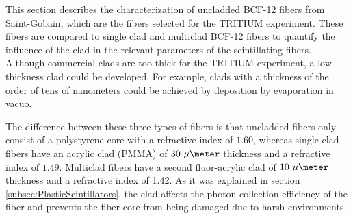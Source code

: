 This section describes the characterization of uncladded BCF-12 fibers from Saint-Gobain, which are the fibers selected for the TRITIUM experiment. These fibers are compared to single clad and multiclad BCF-12 fibers to quantify the influence of the clad in the relevant parameters of the scintillating fibers. Although commercial clads are too thick for the TRITIUM experiment, a low thickness clad could be developed. For example, clads with a thickness of the order of tens of nanometers could be achieved by deposition by evaporation in vacuo. 

The difference between these three types of fibers is that uncladded fibers only consist of a polystyrene core with a refractive index of $1.60$, whereas single clad fibers have an acrylic clad (PMMA) of $30~\mu\meter$ thickness and a refractive index of $1.49$. Multiclad fibers have a second fluor-acrylic clad of $10~\mu\meter$ thickness  and a refractive index of 1.42. As it was explained in section \ref{subsec:PlasticScintillators}, the clad affects the photon collection efficiency of the fiber and prevents the fiber core from being damaged due to harsh environments.




